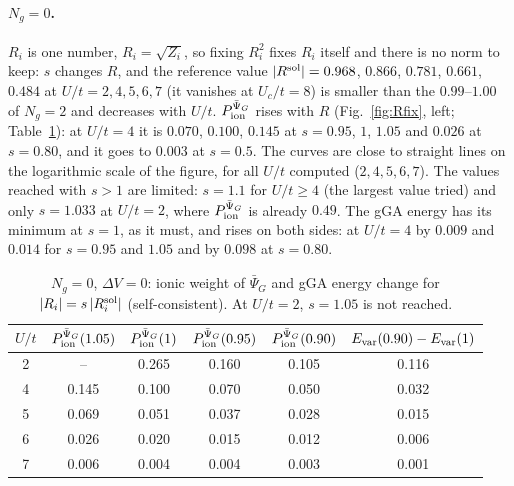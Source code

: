 \documentclass[11pt]{article}
\newcommand{\Ng}{N_{g}}
\newcommand{\dV}{\Delta V}
\begin{document}
\paragraph{$\Ng=0$.} $R_i$ is one number, $R_i=\sqrt{Z_i}$, so fixing $R_i^2$ fixes $R_i$ itself and there is no norm to keep: $s$ changes $R$, and the reference value $|R^{\rm sol}|=0.968$, $0.866$, $0.781$, $0.661$, $0.484$ at $U/t=2,4,5,6,7$ (it vanishes at $U_c/t=8$) is smaller than the $0.99$--$1.00$ of $\Ng=2$ and decreases with $U/t$. $P_{\rm ion}^{\bar\Psi_G}$ rises with $R$ (Fig.~\ref{fig:Rfix}, left; Table~\ref{tab:Rfix0}): at $U/t=4$ it is $0.070$, $0.100$, $0.145$ at $s=0.95$, $1$, $1.05$ and $0.026$ at $s=0.80$, and it goes to $0.003$ at $s=0.5$. The curves are close to straight lines on the logarithmic scale of the figure, for all $U/t$ computed ($2,4,5,6,7$). The values reached with $s>1$ are limited: $s=1.1$ for $U/t\ge4$ (the largest value tried) and only $s=1.033$ at $U/t=2$, where $P_{\rm ion}^{\bar\Psi_G}$ is already $0.49$. The gGA energy has its minimum at $s=1$, as it must, and rises on both sides: at $U/t=4$ by $0.009$ and $0.014$ for $s=0.95$ and $1.05$ and by $0.098$ at $s=0.80$.
\begin{table}[H]
\centering\small
\begin{tabular}{c|cccc|c}
$U/t$ & $P_{\rm ion}^{\bar\Psi_G}(1.05)$ & $P_{\rm ion}^{\bar\Psi_G}(1)$ & $P_{\rm ion}^{\bar\Psi_G}(0.95)$ & $P_{\rm ion}^{\bar\Psi_G}(0.90)$ & $E_{\rm var}(0.90)-E_{\rm var}(1)$\\\hline
2 & -- & 0.265 & 0.160 & 0.105 & 0.116\\
4 & 0.145 & 0.100 & 0.070 & 0.050 & 0.032\\
5 & 0.069 & 0.051 & 0.037 & 0.028 & 0.015\\
6 & 0.026 & 0.020 & 0.015 & 0.012 & 0.006\\
7 & 0.006 & 0.004 & 0.004 & 0.003 & 0.001
\end{tabular}
\caption{$\Ng=0$, $\dV=0$: ionic weight of $\bar\Psi_G$ and gGA energy change for $|R_i|=s\,|R_i^{\rm sol}|$ (self-consistent). At $U/t=2$, $s=1.05$ is not reached.}
\label{tab:Rfix0}
\end{table}
\end{document}
